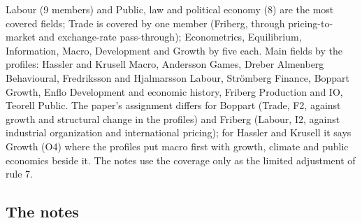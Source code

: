 \documentclass[11pt,a4paper]{article}
\begin{document}
Labour (9 members) and Public, law and political economy (8) are the most covered fields; Trade is covered by one
member (Friberg, through pricing-to-market and exchange-rate pass-through); Econometrics, Equilibrium, Information,
Macro, Development and Growth by five each. Main fields by the profiles: Hassler and Krusell Macro, Andersson Games,
Dreber Almenberg Behavioural, Fredriksson and Hjalmarsson Labour, Strömberg Finance, Boppart Growth, Enflo
Development and economic history, Friberg Production and IO, Teorell Public. The paper's assignment differs for
Boppart (Trade, F2, against growth and structural change in the profiles) and Friberg (Labour, I2, against industrial
organization and international pricing); for Hassler and Krusell it says Growth (O4) where the profiles put macro
first with growth, climate and public economics beside it. The notes use the coverage only as the limited adjustment
of rule 7.

\subsection{The notes}
\end{document}
